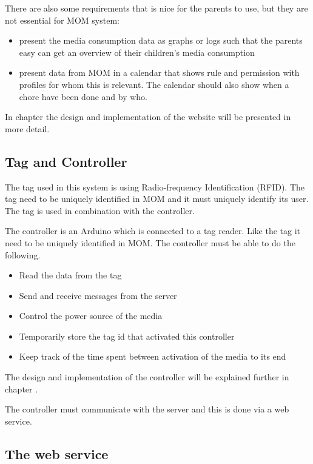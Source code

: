 There are also some requirements that is nice for the parents to use, but they are not essential for MOM system:

\begin{itemize}
	\item present the media consumption data as graphs or logs such that the parents easy can get an overview of their children's media consumption 
	\item present data from MOM in a calendar that shows rule and permission with profiles for whom this is relevant. The calendar should also show when a chore have been done and by who.
\end{itemize}

In chapter  the design and implementation of the website will be presented in more detail. 
 

\subsection{Tag and Controller}
The tag used in this system is using Radio-frequency Identification (RFID). The tag need to be uniquely identified in MOM and it must uniquely identify its user. The tag is used in combination with the controller.

The controller is an Arduino which is connected to a tag reader. Like the tag it need to be uniquely identified in MOM. The controller must be able to do the following.

\begin{itemize}
	\item Read the data from the tag
	\item Send and receive messages from the server
	\item Control the power source of the media 
	\item Temporarily store the tag id that activated this controller
	\item Keep track of the time spent between activation of the media to its end
\end{itemize}
 
The design and implementation of the controller will be explained further in chapter . 

The controller must communicate with the server and this is done via a web service.

\subsection{The web service}

